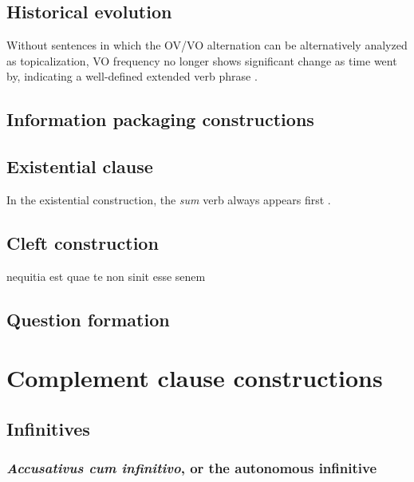 \documentclass[a4paper, oneside, 12pt]{report}
\newcommand*{\citesec}[1]{\S~{#1}}
\newcommand*{\citepage}[1]{p.~{#1}}
\newcommand{\form}[1]{\emph{#1}}
\begin{document}
\section{Historical evolution}\label{sec:constituent-order.history}

Without sentences in which the OV/VO alternation 
can be alternatively analyzed as topicalization,
VO frequency no longer shows significant change as time went by,
indicating a well-defined extended verb phrase \citep[\citesec{1.5}, \citepage{29}]{danckaert2017development}.

\section{Information packaging constructions}

\section{Existential clause}\label{sec:clause.exist}

In the existential construction,
the \form{sum} verb always appears first
\citep[\citepage{396}]{allen1903allen}.

\section{Cleft construction}

nequitia est quae te non sinit esse senem

\section{Question formation}



\chapter{Complement clause constructions}\label{chap:complement-clause}


\section{Infinitives}

\subsection{\form{Accusativus cum infinitivo}, or the autonomous infinitive}\label{sec:complement-clause.infinitive.aci}
\end{document}
